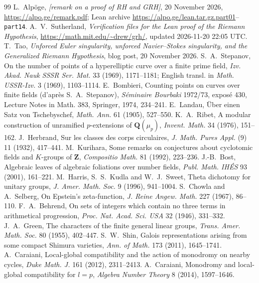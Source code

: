 \documentclass[11pt]{article}
\newcommand{\Lean}[1]{\texttt{\small #1}}
\newcommand{\Q}{\mathbf{Q}}
\newcommand{\Z}{\mathbf{Z}}
\begin{document}
\begin{thebibliography}{99}\footnotesize\setlength{\itemsep}{0pt}
 L.~Alp\"oge, \emph{[remark on a proof of RH and GRH]}, 20 November 2026, \url{https://alpo.ge/remark.pdf}; Lean archive \url{https://alpo.ge/lean.tar.gz.part01}--\Lean{part14}.
 A.~V.~Sutherland, \emph{Verification files for the Lean proof of the Riemann Hypothesis}, \url{https://math.mit.edu/~drew/grh/}, updated 2026-11-20 22:05 UTC.
 T.~Tao, \emph{Unforced Euler singularity, unforced Navier--Stokes singularity, and the Generalized Riemann Hypothesis}, blog post, 20 November 2026.
 S.~A.~Stepanov, On the number of points of a hyperelliptic curve over a finite prime field, \emph{Izv. Akad. Nauk SSSR Ser. Mat.} 33 (1969), 1171--1181; English transl. in \emph{Math. USSR-Izv.} 3 (1969), 1103--1114.
 E.~Bombieri, Counting points on curves over finite fields (d'apr\`es S.~A.~Stepanov), \emph{S\'eminaire Bourbaki} 1972/73, expos\'e 430, Lecture Notes in Math. 383, Springer, 1974, 234--241.
 E.~Landau, \"Uber einen Satz von Tschebyschef, \emph{Math. Ann.} 61 (1905), 527--550.
 K.~A.~Ribet, A modular construction of unramified $p$-extensions of $\Q(\mu_p)$, \emph{Invent. Math.} 34 (1976), 151--162.
 J.~Herbrand, Sur les classes des corps circulaires, \emph{J. Math. Pures Appl.} (9) 11 (1932), 417--441.
 M.~Kurihara, Some remarks on conjectures about cyclotomic fields and $K$-groups of $\Z$, \emph{Compositio Math.} 81 (1992), 223--236.
 J.-B.~Bost, Algebraic leaves of algebraic foliations over number fields, \emph{Publ. Math. IH\'ES} 93 (2001), 161--221.
 M.~Harris, S.~S.~Kudla and W.~J.~Sweet, Theta dichotomy for unitary groups, \emph{J. Amer. Math. Soc.} 9 (1996), 941--1004.
 S.~Chowla and A.~Selberg, On Epstein's zeta-function, \emph{J. Reine Angew. Math.} 227 (1967), 86--110.
 F.~A.~Behrend, On sets of integers which contain no three terms in arithmetical progression, \emph{Proc. Nat. Acad. Sci. USA} 32 (1946), 331--332.
 J.~A.~Green, The characters of the finite general linear groups, \emph{Trans. Amer. Math. Soc.} 80 (1955), 402--447.
 S.~W.~Shin, Galois representations arising from some compact Shimura varieties, \emph{Ann. of Math.} 173 (2011), 1645--1741.
 A.~Caraiani, Local-global compatibility and the action of monodromy on nearby cycles, \emph{Duke Math. J.} 161 (2012), 2311--2413.
 A.~Caraiani, Monodromy and local-global compatibility for $l=p$, \emph{Algebra Number Theory} 8 (2014), 1597--1646.

\end{thebibliography}
\end{document}
